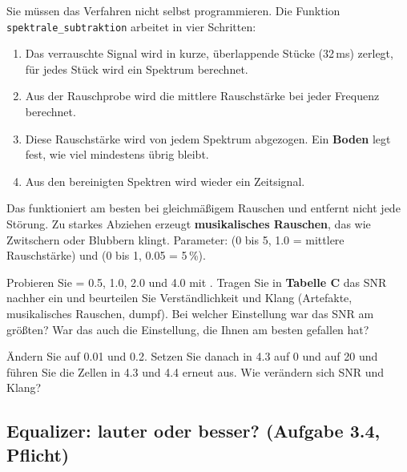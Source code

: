 \documentclass[11pt]{article}
\begin{document}
Sie müssen das Verfahren nicht selbst programmieren. Die Funktion \texttt{spektrale\_subtraktion} arbeitet in vier Schritten:
\begin{enumerate}[label=\arabic*.]
  \item Das verrauschte Signal wird in kurze, überlappende Stücke (32\,ms) zerlegt, für jedes Stück wird ein Spektrum berechnet.
  \item Aus der Rauschprobe wird die mittlere Rauschstärke bei jeder Frequenz berechnet.
  \item Diese Rauschstärke wird von jedem Spektrum abgezogen. Ein \textbf{Boden} legt fest, wie viel mindestens übrig bleibt.
  \item Aus den bereinigten Spektren wird wieder ein Zeitsignal.
\end{enumerate}
Das funktioniert am besten bei gleichmäßigem Rauschen und entfernt nicht jede Störung. Zu starkes Abziehen erzeugt \textbf{musikalisches Rauschen}, das wie Zwitschern oder Blubbern klingt. Parameter:  (0 bis 5, 1.0 = mittlere Rauschstärke) und  (0 bis 1, 0.05 = 5\,\%).

\begin{block}
Probieren Sie  = 0.5, 1.0, 2.0 und 4.0 mit . Tragen Sie in \textbf{Tabelle C} das SNR nachher ein und beurteilen Sie Verständlichkeit und Klang (Artefakte, musikalisches Rauschen, dumpf). Bei welcher Einstellung war das SNR am größten? War das auch die Einstellung, die Ihnen am besten gefallen hat?
\end{block}

\begin{block}
Ändern Sie  auf 0.01 und 0.2. Setzen Sie danach in 4.3  auf 0 und auf 20 und führen Sie die Zellen in 4.3 und 4.4 erneut aus. Wie verändern sich SNR und Klang?
\end{block}

\subsection[Equalizer: lauter oder besser?]{Equalizer: lauter oder besser? (Aufgabe 3.4, Pflicht)}

\end{document}
